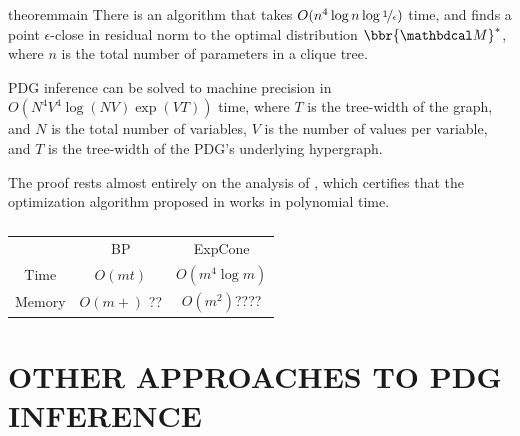 \documentclass[twoside]{article}
\begin{document}
\begin{linked}{theorem}{main}
There is an algorithm that takes $O(n^4 \log n  \log \nicefrac1\epsilon )$ time,
and finds a point $\epsilon$-close in residual norm to the optimal distribution
$\bbr{\dg M}^*$, where $n$ is the total number of parameters in a clique tree.
\end{linked}

\begin{coro}
    PDG inference can be solved to machine precision in $O( N^4 V^4 \log(N V) \exp(V T) )$ time, where $T$ is the tree-width of the graph, and $N$ is the total number of variables, $V$ is the number of values per variable, and $T$ is the tree-width of the PDG's underlying hypergraph.
\end{coro}



The proof rests almost entirely on the analysis of \textcite{badenbroek2021algorithm},
which certifies that the optimization algorithm
proposed in \textcite{dahl2022primal} works in polynomial time.

\begin{table}
    \centering
    \begin{tabular}{ccc}
        \toprule
        & BP &  ExpCone \\\cmidrule(lr){2-3}
        Time & $O(m t)$ & $O( m^4 \log m )$ \\
        Memory  & $O(m + )$ {\color{red}??} & $O( m^2 )${\color{red}????}\\    \bottomrule
    \end{tabular}


    \caption{ }
\end{table}

\section{OTHER APPROACHES TO PDG INFERENCE} \label{sec:other-inference}
\end{document}
